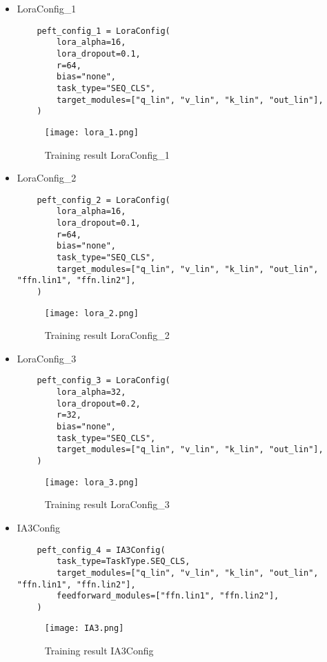 \documentclass{article}
\begin{document}
\begin{itemize}
    \item LoraConfig\_1
    \begin{verbatim}
    peft_config_1 = LoraConfig(
        lora_alpha=16,          
        lora_dropout=0.1,         
        r=64,              
        bias="none",          
        task_type="SEQ_CLS",      
        target_modules=["q_lin", "v_lin", "k_lin", "out_lin"], 
    )
    \end{verbatim}
    \begin{figure}[h]
    \centering
    \texttt{[image: lora\_1.png]}
    \caption{Training result LoraConfig\_1}
    \label{fig:lora_1}
    \end{figure}
        
    \item LoraConfig\_2
    \begin{verbatim}
    peft_config_2 = LoraConfig(
        lora_alpha=16,
        lora_dropout=0.1,
        r=64,
        bias="none",
        task_type="SEQ_CLS",
        target_modules=["q_lin", "v_lin", "k_lin", "out_lin", "ffn.lin1", "ffn.lin2"],  
    )
    \end{verbatim}
    \begin{figure}[h]
    \centering
    \texttt{[image: lora\_2.png]}
    \caption{Training result LoraConfig\_2}
    \label{fig:lora_2}
    \end{figure}

    \vspace{70pt}
    \item LoraConfig\_3
    \begin{verbatim}
    peft_config_3 = LoraConfig(
        lora_alpha=32,
        lora_dropout=0.2,
        r=32,
        bias="none",
        task_type="SEQ_CLS",
        target_modules=["q_lin", "v_lin", "k_lin", "out_lin"],
    )
    \end{verbatim}
    \begin{figure}[h]
    \centering
    \texttt{[image: lora\_3.png]}
    \caption{Training result LoraConfig\_3}
    \label{fig:lora_3}
    \end{figure}
    
    \item IA3Config
    \begin{verbatim}
    peft_config_4 = IA3Config(
        task_type=TaskType.SEQ_CLS,
        target_modules=["q_lin", "v_lin", "k_lin", "out_lin", "ffn.lin1", "ffn.lin2"],
        feedforward_modules=["ffn.lin1", "ffn.lin2"],
    )
    \end{verbatim}
    \begin{figure}[h]
    \centering
    \texttt{[image: IA3.png]}
    \caption{Training result IA3Config}
    \label{fig:IA3}
    \end{figure}
    
\end{itemize}
\end{document}
